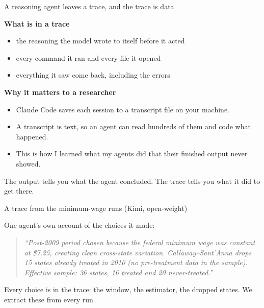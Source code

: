 \documentclass[aspectratio=169,11pt]{beamer}
\begin{document}
\begin{frame}{A reasoning agent leaves a trace, and the trace is data}

\textbf{What is in a trace}
\begin{itemize}\setlength\itemsep{0.25em}
    \item the reasoning the model wrote to itself before it acted
    \item every command it ran and every file it opened
    \item everything it saw come back, including the errors
\end{itemize}

\vspace{0.25cm}

\textbf{Why it matters to a researcher}
\begin{itemize}\setlength\itemsep{0.25em}
    \item Claude Code saves each session to a transcript file on your machine.
    \item A transcript is text, so an agent can read hundreds of them and code what happened.
    \item This is how I learned what my agents did that their finished output never showed.
\end{itemize}

\vspace{0.25cm}

\alert{The output tells you what the agent concluded. The trace tells you what it did to get there.}

\end{frame}

\begin{frame}{A trace from the minimum-wage runs (Kimi, open-weight)}

One agent's own account of the choices it made:

\vspace{0.35cm}

\begin{quote}
\small\itshape ``Post-2009 period chosen because the federal minimum wage was constant at \$7.25, creating clean cross-state variation. Callaway--Sant'Anna drops 15 states already treated in 2010 (no pre-treatment data in the sample). Effective sample: 36 states, 16 treated and 20 never-treated.''
\end{quote}

\vspace{0.35cm}

\alert{Every choice is in the trace: the window, the estimator, the dropped states. We extract these from every run.}

\end{frame}
\end{document}
